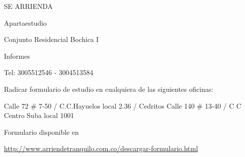 \documentclass[final]{beamer}
  {
}
\date{Jul. 31th, 2007}
\begin{document}
  \begin{frame}{}
\centering
  \begin{block}
  \centering
      {\VeryHuge \begin{center}
      SE ARRIENDA
      \end{center}}\par
      {\Large \begin{center}
      Apartaestudio
      \end{center}}\par
      {\large \begin{center}
      Conjunto Residencial Bochica I
      \end{center}}\par
      {\large \begin{center}
      Informes
      \end{center}}\par
      {\Large \begin{center}
      Tel: 3005512546 - 3004513584 \end{center}}\par
      {\footnotesize \begin{center}
      Radicar formulario de estudio en cualquiera de las siguientes oficinas:\end{center}}\par
      {\footnotesize Calle 72 \# 7-50 / C.C.Hayuelos local 2.36  /  Cedritos Calle 140 \# 13-40 / C C Centro Suba   local 1001}\par
      {\footnotesize \begin{center}
      Formulario disponible en
      \end{center}}\par {\footnotesize \url{http://www.arriendetranquilo.com.co/descargar-formulario.html}}\par
  \end{block}
  \end{frame}
\end{document}
